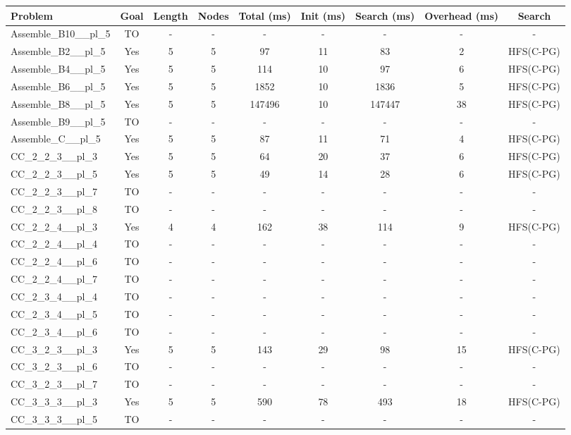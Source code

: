 \documentclass{article}
\begin{document}
\begin{tabular}{lcccccccc}
\toprule
Problem & Goal & Length & Nodes & Total (ms) & Init (ms) & Search (ms) & Overhead (ms) & Search \\
\midrule
Assemble\_B10\_\_pl\_5 & TO & - & - & - & - & - & - & - \\
Assemble\_B2\_\_pl\_5 & Yes & 5 & 5 & 97 & 11 & 83 & 2 & HFS(C-PG) \\
Assemble\_B4\_\_pl\_5 & Yes & 5 & 5 & 114 & 10 & 97 & 6 & HFS(C-PG) \\
Assemble\_B6\_\_pl\_5 & Yes & 5 & 5 & 1852 & 10 & 1836 & 5 & HFS(C-PG) \\
Assemble\_B8\_\_pl\_5 & Yes & 5 & 5 & 147496 & 10 & 147447 & 38 & HFS(C-PG) \\
Assemble\_B9\_\_pl\_5 & TO & - & - & - & - & - & - & - \\
Assemble\_C\_\_pl\_5 & Yes & 5 & 5 & 87 & 11 & 71 & 4 & HFS(C-PG) \\
CC\_2\_2\_3\_\_pl\_3 & Yes & 5 & 5 & 64 & 20 & 37 & 6 & HFS(C-PG) \\
CC\_2\_2\_3\_\_pl\_5 & Yes & 5 & 5 & 49 & 14 & 28 & 6 & HFS(C-PG) \\
CC\_2\_2\_3\_\_pl\_7 & TO & - & - & - & - & - & - & - \\
CC\_2\_2\_3\_\_pl\_8 & TO & - & - & - & - & - & - & - \\
CC\_2\_2\_4\_\_pl\_3 & Yes & 4 & 4 & 162 & 38 & 114 & 9 & HFS(C-PG) \\
CC\_2\_2\_4\_\_pl\_4 & TO & - & - & - & - & - & - & - \\
CC\_2\_2\_4\_\_pl\_6 & TO & - & - & - & - & - & - & - \\
CC\_2\_2\_4\_\_pl\_7 & TO & - & - & - & - & - & - & - \\
CC\_2\_3\_4\_\_pl\_4 & TO & - & - & - & - & - & - & - \\
CC\_2\_3\_4\_\_pl\_5 & TO & - & - & - & - & - & - & - \\
CC\_2\_3\_4\_\_pl\_6 & TO & - & - & - & - & - & - & - \\
CC\_3\_2\_3\_\_pl\_3 & Yes & 5 & 5 & 143 & 29 & 98 & 15 & HFS(C-PG) \\
CC\_3\_2\_3\_\_pl\_6 & TO & - & - & - & - & - & - & - \\
CC\_3\_2\_3\_\_pl\_7 & TO & - & - & - & - & - & - & - \\
CC\_3\_3\_3\_\_pl\_3 & Yes & 5 & 5 & 590 & 78 & 493 & 18 & HFS(C-PG) \\
CC\_3\_3\_3\_\_pl\_5 & TO & - & - & - & - & - & - & - \\

\end{tabular}
\end{document}
